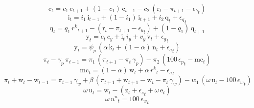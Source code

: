 \begin{dmath}
{{\mathrm{c}}}_{t}={{c_{1}}}\, {{\mathrm{c}}}_{t+1}+\left(1-{{c_{1}}}\right)\, {{\mathrm{c}}}_{t-1}-{{c_{2}}}\, \left({{\mathrm{r}}}_{t}-{{\pi}}_{t+1}-{{\epsilon_{b}}}_{t}\right)
\end{dmath}
\begin{dmath}
{{\mathrm{i}}}_{t}={{i_{1}}}\, {{\mathrm{i}}}_{t-1}+\left(1-{{i_{1}}}\right)\, {{\mathrm{i}}}_{t+1}+{{i_{2}}}\, {{\mathrm{q}}}_{t}+{{\epsilon_{q}}}_{t}
\end{dmath}
\begin{dmath}
{{\mathrm{q}}}_{t}={{q_{1}}}\, {{r^{k}}}_{t+1}-\left({{\mathrm{r}}}_{t}-{{\pi}}_{t+1}-{{\epsilon_{b}}}_{t}\right)+\left(1-{{q_{1}}}\right)\, {{\mathrm{q}}}_{t+1}
\end{dmath}
\begin{dmath}
{{\mathrm{y}}}_{t}={{\mathrm{c}}}_{t}\, {{c_{y}}}+{{\mathrm{i}}}_{t}\, {{i_{y}}}+{{v_{y}}}\, {{\mathrm{v}}}_{t}+{{\epsilon_{g}}}_{t}
\end{dmath}
\begin{dmath}
{{\mathrm{y}}}_{t}={{\psi_{p}}}\, \left({{\alpha}}\, {{\mathrm{k}}}_{t}+\left(1-{{\alpha}}\right)\, {{\mathrm{n}}}_{t}+{{\epsilon_{a}}}_{t}\right)
\end{dmath}
\begin{dmath}
{{\pi}}_{t}-{{\gamma_{p}}}\, {{\pi}}_{t-1}={{\pi_{1}}}\, \left({{\pi}}_{t+1}-{{\pi}}_{t}\, {{\gamma_{p}}}\right)-{{\pi_{2}}}\, \left(100\, {{\epsilon_{p}}}_{t}-{{\mathrm{mc}}}_{t}\right)
\end{dmath}
\begin{dmath}
{{\mathrm{mc}}}_{t}=\left(1-{{\alpha}}\right)\, {{\mathrm{w}}}_{t}+{{\alpha}}\, {{r^{k}}}_{t}-{{\epsilon_{a}}}_{t}
\end{dmath}
\begin{dmath}
{{\pi}}_{t}+{{\mathrm{w}}}_{t}-{{\mathrm{w}}}_{t-1}={{\pi}}_{t-1}\, {{\gamma_{w}}}+{{\beta}}\, \left({{\pi}}_{t+1}+{{\mathrm{w}}}_{t+1}-{{\mathrm{w}}}_{t}-{{\pi}}_{t}\, {{\gamma_{w}}}\right)-{{w_{1}}}\, \left({{\omega}}\, {{\mathrm{u}}}_{t}-100\, {{\epsilon_{w}}}_{t}\right)
\end{dmath}
\begin{dmath}
{{\omega}}\, {{\mathrm{u}}}_{t}={{\mathrm{w}}}_{t}-\left({{\mathrm{z}}}_{t}+{{\epsilon_{s}}}_{t}+{{\omega}}\, {{\mathrm{e}}}_{t}\right)
\end{dmath}
\begin{dmath}
{{\omega}}\, {{u^{n}}}_{t}=100\, {{\epsilon_{w}}}_{t}
\end{dmath}
